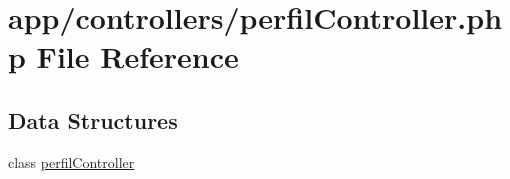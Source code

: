 \hypertarget{perfil_controller_8php}{}\section{app/controllers/perfil\+Controller.php File Reference}
\label{perfil_controller_8php}
\subsection*{Data Structures}
\begin{DoxyCompactItemize}
\item 
class \hyperlink{classperfil_controller}{perfil\+Controller}
\end{DoxyCompactItemize}
